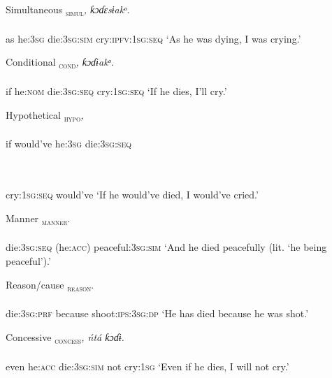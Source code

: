 Simultaneous
\ea\label{ex:}
\textsc{\textsubscript{simul}}\textit{,   ƙɔɗɛsɨakᵒ.} \\
    \\
as   he:\textsc{3sg}   die:\textsc{3sg:sim}    cry:\textsc{ipfv}:\textsc{1sg:seq}
\glt ‘As he was dying, I was crying.’ 
\z




Conditional
\ea\label{ex:}
\textsc{\textsubscript{cond}}\textit{,   ƙɔɗɨakᵒ.} \\
    \\
if   he:\textsc{nom}   die:\textsc{3sg:seq}     cry:\textsc{1sg:seq}
\glt ‘If he dies, I’ll cry.’ 
\z




Hypothetical
\ea\label{ex:}
\textsc{\textsubscript{hypo}}\textit{,}  \\
    \\
if   would’ve   he:\textsc{3sg}  die:\textsc{3sg:seq}   
\z

\ea\label{ex:}
 \\
    \\
cry:\textsc{1sg:seq}  would’ve
\glt ‘If he would’ve died, I would’ve cried.’ 
\z




Manner
\ea\label{ex:}
\textsc{\textsubscript{manner}}. \\
    \\
die:\textsc{3sg:seq}   (he:\textsc{acc})  peaceful:3\textsc{sg:sim}
\glt ‘And he died peacefully (lit. ‘he being peaceful’).’ 
\z




Reason/cause
\ea\label{ex:}
\textsc{\textsubscript{reason}}. \\
    \\
die:\textsc{3sg:prf}   because   shoot:\textsc{ips:3sg:dp}
\glt ‘He has died because he was shot.’ 
\z




Concessive
\ea\label{ex:}
\textsc{\textsubscript{concess}}\textit{,   ńtá   ƙɔɗɨ.} \\
    \\
even   he:\textsc{acc}   die:\textsc{3sg:sim}    not   cry:\textsc{1sg}
\glt ‘Even if he dies, I will not cry.’ 
\z






